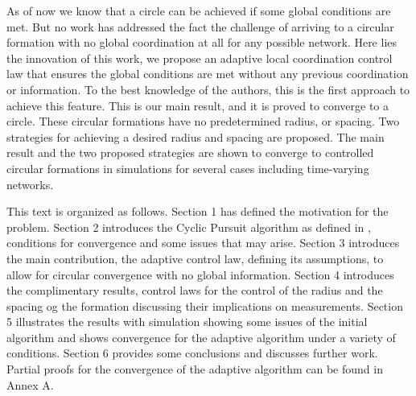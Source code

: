 As of now we know that a circle can be achieved if some global conditions are met. But no work has addressed the fact the challenge of arriving to a circular formation with no global coordination at all for any possible network. Here lies the innovation of this work, we propose an adaptive local coordination control law that ensures the global conditions are met without any previous coordination or information. To the best knowledge of the authors, this is the first approach to achieve this feature. This is our main result, and it is proved to converge to a circle. These circular formations have no predetermined radius, or spacing. Two strategies for achieving a desired radius and spacing are proposed. The main result and the two proposed strategies are shown to converge to controlled circular formations in simulations for several cases including time-varying networks.

This text is organized as follows. Section 1 has defined the motivation for the problem. Section 2 introduces the Cyclic Pursuit algorithm as defined in \cite{galloway2013symmetry}, conditions for convergence and some issues that may arise. Section 3 introduces the main contribution, the adaptive control law, defining its assumptions, to allow for circular convergence with no global information. Section 4 introduces the complimentary results, control laws for the control of the radius and the spacing og the formation discussing their implications on measurements. Section 5 illustrates the results with simulation showing some issues of the initial algorithm and shows convergence for the adaptive algorithm under a variety of conditions. Section 6 provides some conclusions and discusses further work. Partial proofs for the convergence of the adaptive algorithm can be found in Annex A.